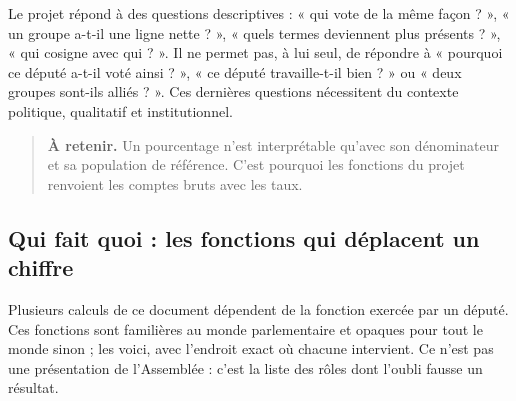 \documentclass[11pt,a4paper]{article}
\newcommand{\important}[1]{\begin{quote}\small\color{blue!55!black}\textbf{À retenir.} #1\end{quote}}
\begin{document}
Le projet répond à des questions descriptives : « qui vote de la même façon ?
», « un groupe a-t-il une ligne nette ? », « quels termes deviennent plus
présents ? », « qui cosigne avec qui ? ». Il ne permet pas, à lui seul, de
répondre à « pourquoi ce député a-t-il voté ainsi ? », « ce député travaille-t-il
bien ? » ou « deux groupes sont-ils alliés ? ». Ces dernières questions
nécessitent du contexte politique, qualitatif et institutionnel.

\important{Un pourcentage n'est interprétable qu'avec son dénominateur et sa
population de référence. C'est pourquoi les fonctions du projet renvoient les
comptes bruts avec les taux.}

\subsection{Qui fait quoi : les fonctions qui déplacent un chiffre}
\label{sec:fonctions}

Plusieurs calculs de ce document dépendent de la fonction exercée par un député.
Ces fonctions sont familières au monde parlementaire et opaques pour tout le
monde sinon ; les voici, avec l'endroit exact où chacune intervient. Ce n'est
pas une présentation de l'Assemblée : c'est la liste des rôles dont l'oubli
fausse un résultat.
\end{document}
